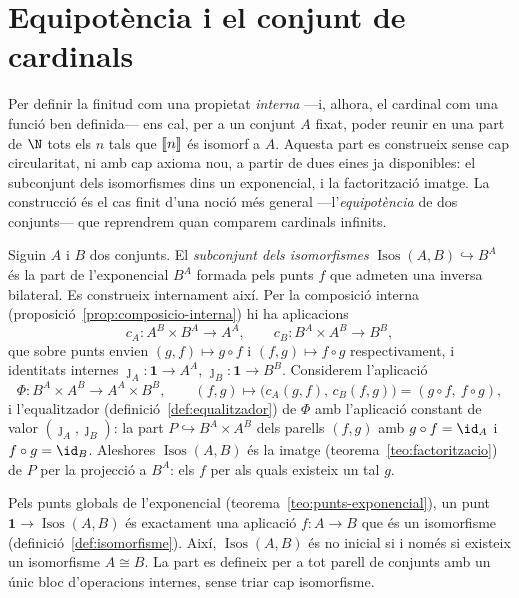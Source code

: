 \section{Equipotència i el conjunt de cardinals}\label{sec:equipotencia}

Per definir la finitud com una propietat \emph{interna} ---i, alhora, el
cardinal com una funció ben definida--- ens cal, per a un conjunt \(A\)
fixat, poder reunir en una part de \(\N\) tots els \(n\) tals que \(\llbracket n\rrbracket\)
és isomorf a \(A\). Aquesta part es construeix sense cap circularitat, ni
amb cap axioma nou, a partir de dues eines ja disponibles: el subconjunt
dels isomorfismes dins un exponencial, i la factorització imatge. La
construcció és el cas finit d'una noció més general ---l'\emph{equipotència}
de dos conjunts--- que reprendrem quan comparem cardinals infinits.

\begin{definicio}\label{def:iso-exponencial}
Siguin \(A\) i \(B\) dos conjunts. El \emph{subconjunt dels isomorfismes}
\(\operatorname{Isos}(A,B)\hookrightarrow B^{A}\) és la part de
l'exponencial \(B^{A}\) formada pels punts \(f\) que admeten una inversa
bilateral. Es construeix internament així. Per la composició interna
(proposició~\ref{prop:composicio-interna}) hi ha aplicacions
\[
c_{A}\colon A^{B}\times B^{A}\to A^{A},
\qquad
c_{B}\colon B^{A}\times A^{B}\to B^{B},
\]
que sobre punts envien \((g,f)\mapsto g\circ f\) i \((f,g)\mapsto f\circ
g\) respectivament, i identitats internes \(\jmath_A\colon\mathbf1\to
A^{A}\), \(\jmath_B\colon\mathbf1\to B^{B}\). Considerem l'aplicació
\[
\Phi\colon B^{A}\times A^{B}\longrightarrow A^{A}\times B^{B},
\qquad
(f,g)\longmapsto\bigl(c_A(g,f),\,c_B(f,g)\bigr)=(g\circ f,\ f\circ g),
\]
i l'equalitzador (definició~\ref{def:equalitzador}) de \(\Phi\) amb
l'aplicació constant de valor \((\jmath_A,\jmath_B)\): la part
\(P\hookrightarrow B^{A}\times A^{B}\) dels parells \((f,g)\) amb \(g\circ
f=\id_A\) i \(f\circ g=\id_B\). Aleshores \(\operatorname{Isos}(A,B)\) és la
imatge (teorema~\ref{teo:factoritzacio}) de \(P\) per la projecció a
\(B^{A}\): els \(f\) per als quals existeix un tal \(g\).
\end{definicio}

\begin{observacio}\label{obs:iso-punts}
Pels punts globals de l'exponencial (teorema~\ref{teo:punts-exponencial}),
un punt \(\mathbf1\to\operatorname{Isos}(A,B)\) és exactament una aplicació
\(f\colon A\to B\) que és un isomorfisme (definició~\ref{def:isomorfisme}).
Així, \(\operatorname{Isos}(A,B)\) és no inicial si i només si existeix un
isomorfisme \(A\cong B\). La part es defineix per a tot parell de conjunts
amb un únic bloc d'operacions internes, sense triar cap isomorfisme.
\end{observacio}

